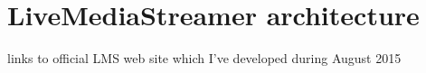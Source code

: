 \chapter{LiveMediaStreamer architecture}\label{ANX:lmsarchfull}

links to official LMS web site which I've developed during August 2015
